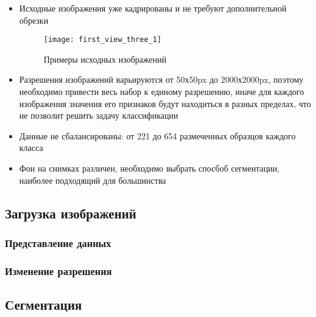 \documentclass[12pt]{article}
\begin{document}
\begin{itemize}
	\item {Исходные изображения уже кадрированы и не требуют дополнительной обрезки 
	\begin{figure}[h!]
		\centering
		\texttt{[image: first\_view\_three\_1]}
		\caption{Примеры исходных изображений}
		\label{fig_2}
	\end{figure}
	}
	\item Разрешения изображений варьируются от 50х50px до 2000х2000px, поэтому необходимо привести весь набор к единому разрешению, иначе для каждого изображения значения его признаков будут находиться в разных пределах, что не позволит решить задачу классификации
	\item Данные не сбалансированы: от 221 до 654 размеченных образцов каждого класса
	\item Фон на снимках различен, необходимо выбрать спосбоб сегментации, наиболее подходящий для большинства
\end{itemize}

\subsection{Загрузка изображений}

\subsubsection{Представление данных}


\subsubsection{Изменение разрешения}


\subsection{Сегментация}
\end{document}

